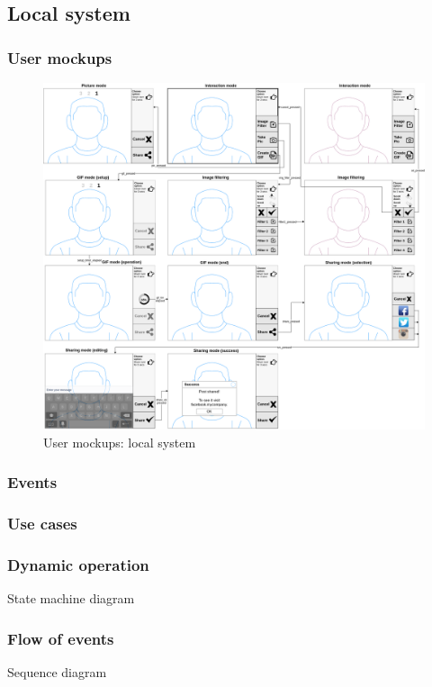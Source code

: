 %
\subsection{Local system}
\label{sec:local-system}

\subsubsection{User mockups}
\label{sec:user-mockups}

\begin{figure}[htb!]
\centering
    \includegraphics[width=1.0\columnwidth]{./img/user-mockups-local.png}
  \caption{User mockups: local system}%
\label{fig:user-mockups-local}
\end{figure}

\subsubsection{Events}
\label{sec:events}

\subsubsection{Use cases}
\label{sec:use-cases}

\subsubsection{Dynamic operation}
\label{sec:dyn-oper}
State machine diagram

\subsubsection{Flow of events}
\label{sec:flow-events}
Sequence diagram

